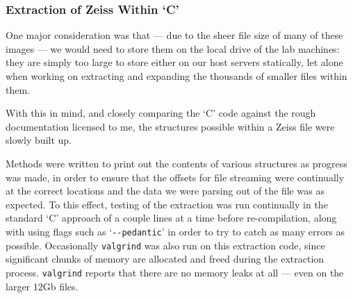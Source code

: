 \subsubsection{Extraction of Zeiss Within `C'}
One major consideration was that --- due to the sheer file size of many of these images --- we would need
to store them on the local  drive of the lab machines: they are simply too
large to store either on our host servers statically, let alone when working on extracting and expanding the
thousands of smaller files within them.

With this in mind, and closely comparing the
`C' code against the rough documentation licensed to me, the structures possible within a Zeiss file were
slowly built up.

Methods were written to print out the contents of various structures as progress was made, in
order to ensure that the offsets for file streaming were continually at the correct locations and the data we
were parsing out of the file was as expected. To this effect, testing of the extraction was run continually
in the standard `C' approach of a couple lines at a time before re-compilation, along with using flags such as
`\verb|--pedantic|' in order to try to catch as many errors as possible. Occasionally \verb|valgrind| was also
run on this extraction code, since significant chunks of memory are allocated and freed during the
extraction process. \verb|valgrind| reports that there are no memory leaks at all --- even
on the larger 12Gb  files.

